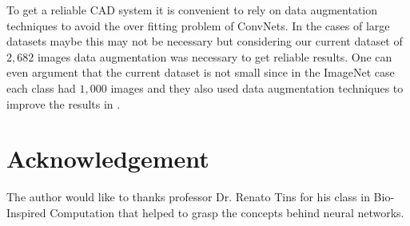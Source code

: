 \documentclass[twocolumn]{article}
\newcommand{\mycite}{\cite}
\begin{document}
To get a reliable CAD system it is convenient to rely on data augmentation techniques to avoid the over fitting problem of ConvNets. In the cases of large datasets maybe this may not be necessary but considering our current dataset of $2,682$ images data augmentation was necessary to get reliable results. One can even argument that the current dataset is not small since in the ImageNet case each class had $1,000$ images and they also used data augmentation techniques to improve the results in \mycite{ImageNet}.
\section*{Acknowledgement}
The author would like to thanks professor Dr. Renato Tins for his class in Bio-Inspired Computation that helped to grasp the concepts behind neural networks.

\printbibliography
\end{document}
